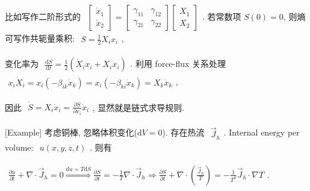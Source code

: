\documentclass[../../main.tex]{subfiles}
\begin{document}
比如写作二阶形式的 $\begin{aligned}
    \begin{bmatrix}
        \dot{x}_{1}\\\dot{x}_{2}
    \end{bmatrix} = \begin{bmatrix}
        \gamma_{11} & \gamma_{12}\\
        \gamma_{21} & \gamma_{22}
    \end{bmatrix}\begin{bmatrix}
        X_{1}\\X_{2}
    \end{bmatrix}
\end{aligned}$. 若常数项 $S(0) = 0$, 则熵可写作共轭量乘积: $\begin{aligned}
    S = \frac{1}{2}X_{i}x_{i}
\end{aligned}$, 

变化率为 $\begin{aligned}
    \frac{\mathrm{d}S}{\mathrm{d}t} = \frac{1}{2}\left(
    \dot{X}_{i}x_{i} + X_{i}\dot{x}_{i}
    \right)
\end{aligned}$. 利用 force-flux 关系处理 $\begin{aligned}
    x_{i}\dot{X}_{i} = x_{i}\left(-\beta_{ik}\dot{x}_{k}\right) = x_{i}\left(-\beta_{ki}\dot{x}_{k}\right) = X_{k}\dot{x}_{k}
\end{aligned}$, 

因此 $\begin{aligned}
    \dot{S} = X_{i}\dot{x}_{i} = \frac{\partial S}{\partial x_{i}}\dot{x}_{i}
\end{aligned}$, 显然就是链式求导规则. 

[Example] 考虑铜棒, 忽略体积变化($\mathrm{d}V = 0$). 存在热流 $\begin{aligned}
    \vec{J}_{h}
\end{aligned}$. Internal energy per volume: $\begin{aligned}
    u(x,y,z,t)
\end{aligned}$. 则有 

$\begin{aligned}
    \frac{\partial u}{\partial t} + \nabla\cdot\vec{J}_{h} = 0\stackrel{\mathrm{d}u = T\mathrm{d}S}{\Longrightarrow}\frac{\partial S}{\partial t} = -\frac{1}{T}\nabla\cdot\vec{J}_{h}\Rightarrow \frac{\partial S}{\partial t} + \nabla\cdot\left(\frac{\vec{J}_{h}}{T}\right) = -\frac{1}{T^{2}}\vec{J}_{h}\cdot\nabla T
\end{aligned}$. 
\end{document}
